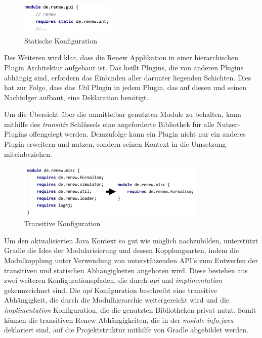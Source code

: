 	\begin{figure}[h!]
	  \centering
	  \includegraphics[width=0.4\textwidth]{material/images/gui_config.png}
	  \caption{Statische Konfiguration}
	  \label{fig:remote_config}
	\end{figure}

	Des Weiteren wird klar, dass die Renew Applikation in einer hierarchischen Plugin Architektur aufgebaut ist. Das heißt Plugins, die von anderen Plugins abhängig sind, erfordern das Einbinden aller darunter liegenden Schichten. Dies hat zur Folge, dass das \textit{Util} Plugin in jedem Plugin, das auf diesen und seinen Nachfolger aufbaut, eine Deklaration benötigt. \newline

	Um die Übersicht über die unmittelbar genutzten Module zu behalten, kann mithilfe des \textit{transitiv}  Schlüssels eine angeforderte Bibliothek für alle Nutzer-Plugins offengelegt werden. Demzufolge kann ein Plugin nicht nur ein anderes Plugin erweitern und nutzen, sondern seinen Kontext in die Umsetzung miteinbeziehen. \bigbreak

	\begin{figure}[h!]
	  \centering
	  \includegraphics[width=0.8\textwidth]{material/images/misc_trans.png}
	  \caption{Transitive Konfiguration}
	  \label{fig:trans_config}
	\end{figure}

	Um den aktualisierten Java Kontext so gut wie möglich nachzubilden, unterstützt Gradle die Idee der  Modularisierung und dessen Kopplungsarten, indem die Modulkopplung unter Verwendung von unterstützenden API's zum Entwerfen der transitiven und statischen Abhängigkeiten angeboten wird. Diese bestehen aus zwei weiteren Konfigurationspfaden, die durch \textit{api} und \textit{implimentation} gekennzeichnet sind. Die \textit{api} Konfiguration beschreibt eine transitive Abhängigkeit, die durch die Modulhierarchie weitergereicht wird und die \textit{implimentation} Konfiguration, die die genutzten Bibliotheken privat nutzt. Somit können die transitiven Renew Abhängigkeiten, die in der \textit{module-info.java} deklariert sind, auf die Projektstruktur mithilfe von Gradle abgebildet werden.

